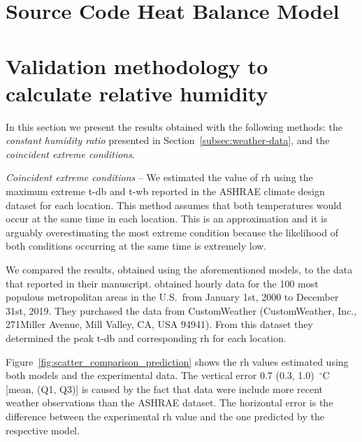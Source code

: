 
\appendix


\section{Source Code Heat Balance Model}\label{sec:python_code}




\section{Validation methodology to calculate relative humidity}\label{sec:validation_rh}

In this section we present the results obtained with the following methods: the \textit{constant humidity ratio} presented in Section~\ref{subsec:weather-data}, and the \textit{coincident extreme conditions}.

\textit{Coincident extreme conditions} -- We estimated the value of \ac{rh} using the maximum extreme \ac{t-db} and \ac{t-wb} reported in the ASHRAE climate design dataset for each location.
This method assumes that both temperatures would occur at the same time in each location.
This is an approximation and it is arguably overestimating the most extreme condition because the likelihood of both conditions occurring at the same time is extremely low.

We compared the results, obtained using the aforementioned models, to the data that  reported in their manuscript.
 obtained hourly data for the 100 most populous metropolitan areas in the U.S.\ from January 1st, 2000 to December 31st, 2019.
They purchased the data from CustomWeather (CustomWeather, Inc., 271Miller Avenue, Mill Valley, CA, USA 94941).
From this dataset they determined the peak \ac{t-db} and corresponding \ac{rh} for each location.

Figure~\ref{fig:scatter_comparison_prediction} shows the \ac{rh} values estimated using both models and the experimental data.
The vertical error 0.7 (0.3, 1.0)~$^{\circ}$C [mean, (Q1, Q3)] is caused by the fact that  data were include more recent weather observations than the ASHRAE dataset.
The horizontal error is the difference between the experimental \ac{rh} value and the one predicted by the respective model.

